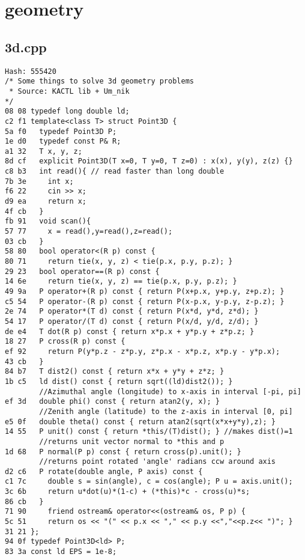 \documentclass[11pt, a4paper, twoside]{article}
\begin{document}
%
%

\section{geometry}

\subsection{3d.cpp}
\begin{lstlisting}
Hash: 555420
/* Some things to solve 3d geometry problems
 * Source: KACTL lib + Um_nik
*/
08 08 typedef long double ld;
c2 f1 template<class T> struct Point3D {
5a f0   typedef Point3D P;
1e d0   typedef const P& R;
a1 32   T x, y, z;
8d cf   explicit Point3D(T x=0, T y=0, T z=0) : x(x), y(y), z(z) {}
c8 b3   int read(){ // read faster than long double
7b 3e     int x;
f6 22     cin >> x;
d9 ea     return x;
4f cb   }
fb 91   void scan(){
57 77     x = read(),y=read(),z=read();
03 cb   }
58 80   bool operator<(R p) const {
80 71     return tie(x, y, z) < tie(p.x, p.y, p.z); }
29 23   bool operator==(R p) const {
14 6e     return tie(x, y, z) == tie(p.x, p.y, p.z); }
49 9a   P operator+(R p) const { return P(x+p.x, y+p.y, z+p.z); }
c5 54   P operator-(R p) const { return P(x-p.x, y-p.y, z-p.z); }
2e 74   P operator*(T d) const { return P(x*d, y*d, z*d); }
54 17   P operator/(T d) const { return P(x/d, y/d, z/d); }
de e4   T dot(R p) const { return x*p.x + y*p.y + z*p.z; }
18 27   P cross(R p) const {
ef 92     return P(y*p.z - z*p.y, z*p.x - x*p.z, x*p.y - y*p.x);
43 cb   }
84 b7   T dist2() const { return x*x + y*y + z*z; }
1b c5   ld dist() const { return sqrt((ld)dist2()); }
        //Azimuthal angle (longitude) to x-axis in interval [-pi, pi]
ef 3d   double phi() const { return atan2(y, x); } 
        //Zenith angle (latitude) to the z-axis in interval [0, pi]
e5 0f   double theta() const { return atan2(sqrt(x*x+y*y),z); }
14 55   P unit() const { return *this/(T)dist(); } //makes dist()=1
        //returns unit vector normal to *this and p
1d 68   P normal(P p) const { return cross(p).unit(); }
        //returns point rotated 'angle' radians ccw around axis
d2 c6   P rotate(double angle, P axis) const {
c1 7c     double s = sin(angle), c = cos(angle); P u = axis.unit();
3c 6b     return u*dot(u)*(1-c) + (*this)*c - cross(u)*s;
86 cb   }
71 90     friend ostream& operator<<(ostream& os, P p) {
5c 51     return os << "(" << p.x << "," << p.y <<","<<p.z<< ")"; }
31 21 };
94 0f typedef Point3D<ld> P;
83 3a const ld EPS = 1e-8;



\end{lstlisting}
\end{document}

